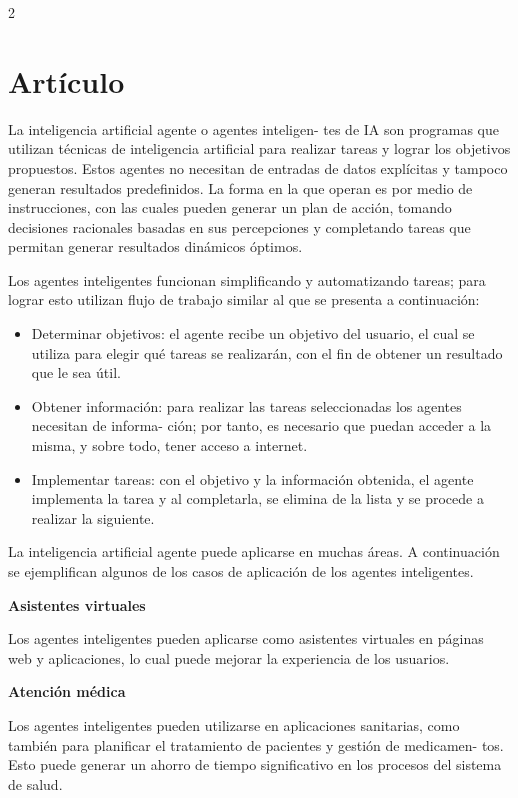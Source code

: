 \documentclass[12pt,spanish,Letterpaper,openany]{book}
\begin{document}
\begin {multicols}{2}
\hypertarget{artuxedculo-6}{%
\section{Artículo}\label{artuxedculo-6}}

La inteligencia artificial agente o agentes inteligen-
tes de IA son programas que utilizan técnicas de inteligencia artificial para realizar tareas y lograr los objetivos propuestos. Estos agentes no necesitan de entradas de datos explícitas y tampoco generan resultados predefinidos. La forma en la que operan es por medio de instrucciones, con las cuales pueden generar un plan de acción, tomando decisiones racionales basadas en sus percepciones y completando tareas que permitan generar resultados dinámicos óptimos.

Los agentes inteligentes funcionan simplificando y automatizando tareas; para lograr esto utilizan flujo de trabajo similar al que se presenta a continuación:

\begin{itemize}
\item
  Determinar objetivos: el agente recibe un objetivo del usuario, el cual se utiliza para elegir qué tareas se realizarán, con el fin de obtener un resultado que le sea útil.
\item
  Obtener información: para realizar las tareas seleccionadas los agentes necesitan de informa-
  ción; por tanto, es necesario que puedan acceder a la misma, y sobre todo, tener acceso a internet.
\item
  Implementar tareas: con el objetivo y la información obtenida, el agente implementa la tarea y al completarla, se elimina de la lista y se procede a realizar la siguiente.
\end{itemize}

La inteligencia artificial agente puede aplicarse en muchas áreas. A continuación se ejemplifican algunos de los casos de aplicación de los agentes inteligentes.

\textbf{Asistentes virtuales}

Los agentes inteligentes pueden aplicarse como asistentes virtuales en páginas web y aplicaciones, lo cual puede mejorar la experiencia de los usuarios.

\textbf{Atención médica}

Los agentes inteligentes pueden utilizarse en aplicaciones sanitarias, como también para planificar el tratamiento de pacientes y gestión de medicamen-
tos. Esto puede generar un ahorro de tiempo significativo en los procesos del sistema de salud.


\end{multicols}
\end{document}
